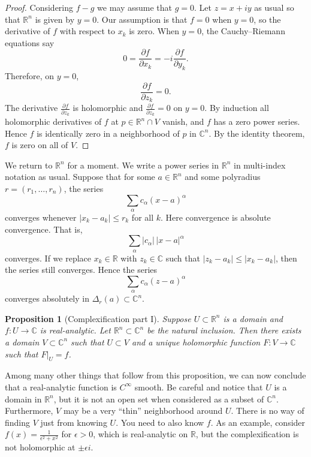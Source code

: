 \documentclass[12pt,openany]{book}
\newcommand{\sabs}[1]{\lvert {#1} \rvert}
\newcommand{\C}{{\mathbb{C}}}
\newcommand{\R}{{\mathbb{R}}}
\theoremstyle{plain}
\newtheorem{prop}[thm]{Proposition}
\theoremstyle{remark}
\theoremstyle{definition}
\theoremstyle{exercise}
\theoremstyle{example}
\begin{document}
\begin{proof}
Considering $f-g$ we may assume that $g=0$.
Let $z = x+iy$ as usual so that $\R^n$ is given by $y=0$.
Our assumption is that $f = 0$ when $y=0$,
so the derivative of $f$ with respect to $x_k$ is zero.
When $y=0$,
the Cauchy--Riemann equations say
\begin{equation*}
0 = \frac{\partial f}{\partial x_k} =
-i \frac{\partial f}{\partial y_k} .
\end{equation*}
Therefore, on $y=0$,
\begin{equation*}
\frac{\partial f }{\partial z_k} = 0 .
\end{equation*}
The derivative $\frac{\partial f }{\partial z_k}$ is holomorphic
and $\frac{\partial f }{\partial z_k} = 0$ on $y=0$.
By induction all holomorphic derivatives of $f$ at $p \in \R^n \cap V$ vanish,
and $f$ has a zero
power series.  Hence $f$ is identically zero in a neighborhood of
$p$ in $\C^n$.
By the identity theorem, $f$ is zero on all of $V$.
\end{proof}


We return to $\R^n$ for a moment.
We write a power series in $\R^n$ in multi-index notation as usual.
Suppose that for some
$a \in \R^n$
and some polyradius
$r=(r_1,\ldots,r_n)$,
the series
\begin{equation*}
\sum_{\alpha} c_{\alpha} {(x-a)}^\alpha
\end{equation*}
converges whenever $\sabs{x_k-a_k} \leq r_k$ for all $k$.
Here convergence is absolute convergence.  That is,
\begin{equation*}
\sum_{\alpha} \sabs{c_{\alpha}}\, \sabs{x-a}^\alpha
\end{equation*}
converges.
If we replace $x_k \in \R$ with $z_k \in \C$ such that
$\sabs{z_k-a_k} \leq \sabs{x_k-a_k}$, then the series still converges.
Hence the series
\begin{equation*}
\sum_{\alpha} c_{\alpha} {(z-a)}^\alpha
\end{equation*}
converges absolutely in $\Delta_r(a) \subset \C^n$.

\begin{prop}[Complexification part I]
Suppose $U \subset \R^n$ is a domain and
$f \colon U \to \C$ is real-analytic.
Let $\R^n \subset \C^n$ be the natural inclusion.
Then there exists a domain $V \subset \C^n$ such that $U \subset V$
and a unique holomorphic function $F \colon V \to \C$ such that $F|_U = f$.
\end{prop}

Among many other things that follow from this proposition, we
can now conclude that a real-analytic function is $C^\infty$ smooth.  Be careful
and notice that $U$ is a domain in $\R^n$, but it is not an open set
when considered as a subset of $\C^n$.  Furthermore, $V$ may be a very
``thin'' neighborhood around $U$.  There is no way of finding $V$ just from
knowing $U$.  You need to also know $f$.
As an example, consider
$f(x) = \frac{1}{\epsilon^2+x^2}$ for $\epsilon > 0$, which is
real-analytic on $\R$, but the complexification is not holomorphic at $\pm
\epsilon i$.
\end{document}
